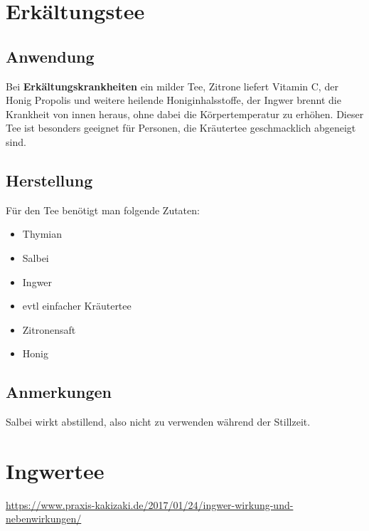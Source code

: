 \newpage


\section{Erkältungstee}


\subsection{Anwendung}

Bei \textbf{Erkältungskrankheiten} ein milder Tee, Zitrone liefert Vitamin C, der Honig Propolis und weitere heilende Honiginhalsstoffe, der Ingwer brennt die Krankheit von innen heraus, ohne dabei die Körpertemperatur zu erhöhen. Dieser Tee ist besonders geeignet für Personen, die Kräutertee geschmacklich abgeneigt sind.

\subsection{Herstellung}

Für den Tee benötigt man folgende Zutaten:

\begin{itemize}
	\item Thymian
	\item Salbei
	\item Ingwer
	\item evtl einfacher Kräutertee
	\item Zitronensaft
	\item Honig
\end{itemize}


\subsection{Anmerkungen}

Salbei wirkt abstillend, also nicht zu verwenden während der Stillzeit.


\newpage



\section{Ingwertee}

\url{https://www.praxis-kakizaki.de/2017/01/24/ingwer-wirkung-und-nebenwirkungen/}

  

